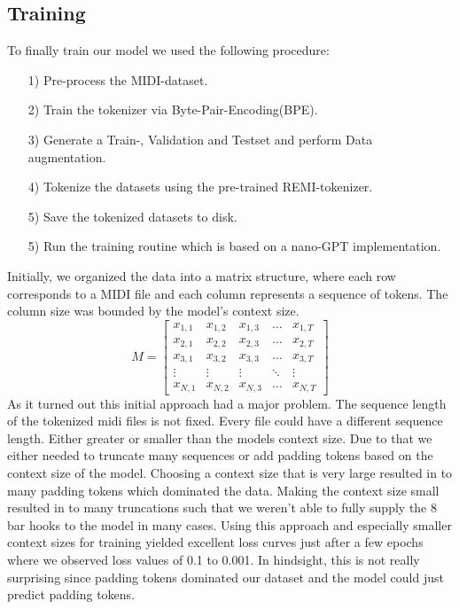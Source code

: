 \documentclass[a4paper,12pt]{extarticle}
\begin{document}
\subsection{Training}
    \label{sec:Training}
To finally train our model we used the following procedure:
    \begin{itemize}
        \item[1)] Pre-process the MIDI-dataset.
        \item[2)] Train the tokenizer via Byte-Pair-Encoding(BPE).
        \item[3)] Generate a Train-, Validation and Testset and perform Data augmentation.
        \item[4)] Tokenize the datasets using the pre-trained REMI-tokenizer.
        \item[5)] Save the tokenized datasets to disk.
        \item[5)] Run the training routine which is based on a nano-GPT implementation.
    \end{itemize}
Initially, we organized the data into a matrix structure, where each row corresponds to a MIDI file and each column represents a sequence of tokens. The column size was bounded by the model's context size.
\[
M =
\begin{bmatrix}
    x_{1,1} & x_{1,2} & x_{1,3} & \dots & x_{1,T} \\
    x_{2,1} & x_{2,2} & x_{2,3} & \dots & x_{2,T} \\
    x_{3,1} & x_{3,2} & x_{3,3} & \dots & x_{3,T} \\
    \vdots  & \vdots  & \vdots  & \ddots & \vdots  \\
    x_{N,1} & x_{N,2} & x_{N,3} & \dots & x_{N,T}
\end{bmatrix}
\]
As it turned out this initial approach had a major problem.
The sequence length of the tokenized midi files is not fixed. Every file could have a different sequence length. Either greater or smaller than the models context size. Due to that we either needed to truncate many sequences or add padding tokens based on the context size of the model. Choosing a context size that is very large resulted in to many padding tokens which dominated the data. Making the context size small resulted in to many truncations such that we weren't able to fully supply the 8 bar hooks to the model in many cases. Using this approach and especially smaller context sizes for training yielded excellent loss curves just after a few epochs where we observed loss values of 0.1 to 0.001. In hindsight, this is not really surprising since padding tokens dominated our dataset and the model could just predict padding tokens. 
\end{document}
